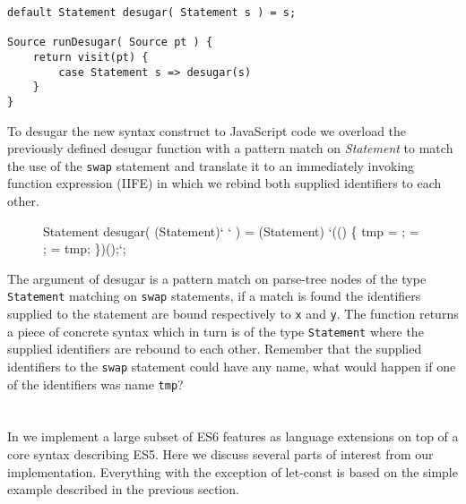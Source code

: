 \begin{lstlisting}[caption=Desugar visitor, language=rascal]
default Statement desugar( Statement s ) = s;

Source runDesugar( Source pt ) {
	return visit(pt) {
		case Statement s => desugar(s)
	}
}
\end{lstlisting}

To desugar the new syntax construct to JavaScript code we overload the previously defined desugar function with a pattern match on 
\textit{Statement} to match the use of the \lstinline$swap$ statement and translate it to an immediately invoking function expression (IIFE) in which we rebind both supplied identifiers to each other.


\begin{figure}
\caption{}
\begin{rascal}
Statement desugar( (Statement)`  ` )
    = (Statement)
            `(() \{{}
            	 tmp = ;
            	 = ;
            	 = tmp;
            \}{})();`;
\end{rascal}
\end{figure}

The argument of desugar is a pattern match on parse-tree nodes of the type \lstinline$Statement$ matching on \lstinline$swap$ statements, if a match is found the identifiers supplied to the statement are bound respectively to \lstinline$x$ and \lstinline$y$. The function returns a piece of concrete syntax which in turn is of the type \lstinline$Statement$ where the supplied identifiers are rebound to each other. Remember that the supplied identifiers to the \lstinline$swap$ statement could have any name, what would happen if one of the identifiers was name \lstinline$tmp$?

\section{\projectname}
In \textit{\projectname} we implement a large subset of ES6 features as language extensions on top of a core syntax describing ES5. Here we discuss several parts of interest from our implementation. Everything with the exception of let-const is based on the simple example described in the previous section. 

